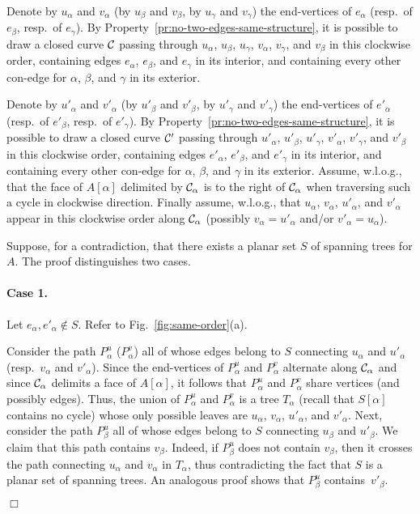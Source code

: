 \documentclass[letter,runningheads]{llncs}
\renewenvironment{proof}
{{\em Proof.\ }}{\hspace*{\fill}$\Box$\par\vspace{2mm}}
\begin{document}
\begin{proof}
Denote by $u_{\alpha}$ and $v_{\alpha}$ (by $u_{\beta}$ and $v_{\beta}$, by $u_{\gamma}$ and $v_{\gamma}$) the end-vertices of $e_{\alpha}$ (resp.\ of $e_{\beta}$, resp.\ of $e_{\gamma}$). By Property~\ref{pr:no-two-edges-same-structure}, it is possible to draw a closed curve $\cal C$ passing through $u_{\alpha}$, $u_{\beta}$, $u_{\gamma}$, $v_{\alpha}$, $v_{\gamma}$, and $v_{\beta}$ in this clockwise order, containing edges $e_{\alpha}$, $e_{\beta}$, and $e_{\gamma}$ in its interior, and containing every other con-edge for $\alpha$, $\beta$, and $\gamma$ in its exterior.

Denote by $u'_{\alpha}$ and $v'_{\alpha}$ (by $u'_{\beta}$ and $v'_{\beta}$, by $u'_{\gamma}$ and $v'_{\gamma}$) the end-vertices of $e'_{\alpha}$ (resp.\ of $e'_{\beta}$, resp.\ of $e'_{\gamma}$). By Property~\ref{pr:no-two-edges-same-structure}, it is possible to draw a closed curve ${\cal C}'$ passing through $u'_{\alpha}$, $u'_{\beta}$, $u'_{\gamma}$, $v'_{\alpha}$, $v'_{\gamma}$, and $v'_{\beta}$ in this clockwise order, containing edges $e'_{\alpha}$, $e'_{\beta}$, and $e'_{\gamma}$ in its interior, and containing every other con-edge for $\alpha$, $\beta$, and $\gamma$ in its exterior. Assume, w.l.o.g., that the face of $A[\alpha]$ delimited by ${\cal C}_{\alpha}$ is to the right of ${\cal C}_{\alpha}$ when traversing such a cycle in clockwise direction. Finally assume, w.l.o.g., that $u_{\alpha}$, $v_{\alpha}$, $u'_{\alpha}$, and $v'_{\alpha}$ appear in this clockwise order along ${\cal C}_{\alpha}$ (possibly $v_{\alpha}=u'_{\alpha}$ and/or $v'_{\alpha}=u_{\alpha}$).

Suppose, for a contradiction, that there exists a planar set $S$ of spanning trees for $A$. The proof distinguishes two cases.

\paragraph{Case 1.} Let $e_{\alpha},e'_{\alpha} \notin S$. Refer to Fig.~\ref{fig:same-order}(a).

Consider the path $P^u_{\alpha}$ ($P^v_{\alpha}$) all of whose edges belong to $S$ connecting $u_{\alpha}$ and $u'_{\alpha}$ (resp.\ $v_{\alpha}$ and $v'_{\alpha}$). Since the end-vertices of $P^u_{\alpha}$ and $P^v_{\alpha}$ alternate along ${\cal C}_{\alpha}$ and since ${\cal C}_{\alpha}$ delimits a face of $A[\alpha]$, it follows that $P^u_{\alpha}$ and $P^v_{\alpha}$ share vertices (and possibly edges). Thus, the union of $P^u_{\alpha}$ and $P^v_{\alpha}$ is a tree $T_{\alpha}$ (recall that $S[\alpha]$ contains no cycle) whose only possible leaves are $u_{\alpha}$, $v_{\alpha}$, $u'_{\alpha}$, and $v'_{\alpha}$. Next, consider the path $P^u_{\beta}$ all of whose edges belong to $S$ connecting $u_{\beta}$ and $u'_{\beta}$. We claim that this path contains $v_{\beta}$. Indeed, if $P^u_{\beta}$ does not contain $v_{\beta}$, then it crosses the path connecting $u_{\alpha}$ and $v_{\alpha}$ in $T_{\alpha}$, thus contradicting the fact that $S$ is a planar set of spanning trees. An analogous proof shows that $P^u_{\beta}$ contains~$v'_{\beta}$.


\end{proof}
\end{document}
